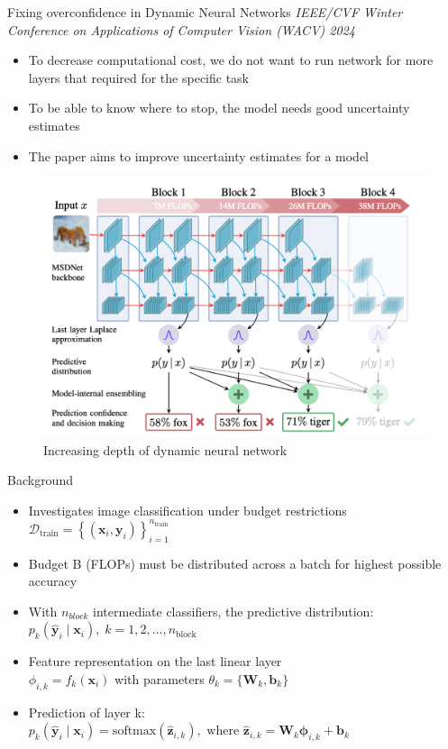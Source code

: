\begin{frame}{Fixing overconfidence in Dynamic Neural Networks}
    \textit{IEEE/CVF Winter Conference on Applications of Computer Vision (WACV) 2024
    }

    \begin{itemize}
        \item To decrease computational cost, we do not want to run network for more layers that required for the specific task
        \item To be able to know where to stop, the model needs good uncertainty estimates
        \item The paper aims to improve uncertainty estimates for a model
    \end{itemize}
    \begin{figure}
        \centering
        \includegraphics[width=0.4\linewidth]{Screenshot 2025-04-08 at 15.02.28.png}
        \caption{Increasing depth of dynamic neural network}
        \label{fig:enter-label}
    \end{figure}
\end{frame}

\begin{frame}{Background}

    \begin{itemize}
        \item Investigates image classification under budget restrictions \\
              \(\mathcal{D}_{\text{train}} = \left\{ (\mathbf{x}_i, \mathbf{y}_i) \right\}_{i=1}^{n_{\text{train}}}\)
        \item Budget B (FLOPs) must be distributed across a batch for highest possible accuracy
        \item With $n_{block}$ intermediate classifiers, the predictive distribution: \\
              \( p_k(\hat{\mathbf{y}}_i \mid \mathbf{x}_i),\; k = 1, 2, \ldots, n_{\text{block}} \)
        \item Feature representation on the last linear layer \\
              \( \phi_{i,k} = f_k(\mathbf{x}_i) \) with parameters \( \theta_k = \{ \mathbf{W}_k, \mathbf{b}_k \} \)
        \item Prediction of layer k: \\
              \( p_k(\hat{\mathbf{y}}_i \mid \mathbf{x}_i) = \text{softmax}(\hat{\mathbf{z}}_{i,k}), \text{ where } \hat{\mathbf{z}}_{i,k} = \mathbf{W}_k \boldsymbol{\phi}_{i,k} + \mathbf{b}_k \)



    \end{itemize}

\end{frame}

